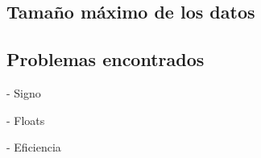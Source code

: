 
%
%
%
%
%
%
%
%
%
%
%
%
%
%
%
%
%
%
%
%
%
%
%
%
%
%

\subsection{Tamaño máximo de los datos}




\subsection{Problemas encontrados}

- Signo

- Floats

- Eficiencia


